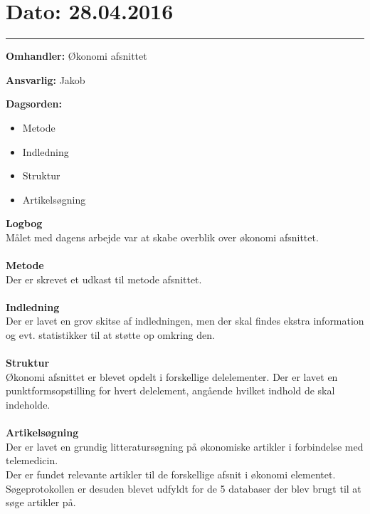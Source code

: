 \section{Dato: 28.04.2016}
\hrule

\textbf{Omhandler:} Økonomi afsnittet

\textbf{Ansvarlig:} Jakob

\textbf{Dagsorden:}
\begin{itemize}
	\item Metode
	\item Indledning
	\item Struktur
	\item Artikelsøgning
\end{itemize}

\textbf{Logbog}
\\
Målet med dagens arbejde var at skabe overblik over økonomi afsnittet. 
\\ \\

\textbf{Metode}
\\
Der er skrevet et udkast til metode afsnittet. 
\\ \\

\textbf{Indledning}
\\
Der er lavet en grov skitse af indledningen, men der skal findes ekstra information og evt. statistikker til at støtte op omkring den. 
\\ \\

\textbf{Struktur}
\\
Økonomi afsnittet er blevet opdelt i forskellige delelementer. Der er lavet en punktformsopstilling for hvert delelement, angående hvilket indhold de skal indeholde.
\\ \\

\textbf{Artikelsøgning}
\\
Der er lavet en grundig litteratursøgning på økonomiske artikler i forbindelse med telemedicin. \\
Der er fundet relevante artikler til de forskellige afsnit i økonomi elementet. \\
Søgeprotokollen er desuden blevet udfyldt for de 5 databaser der blev brugt til at søge artikler på. 
\\ \\